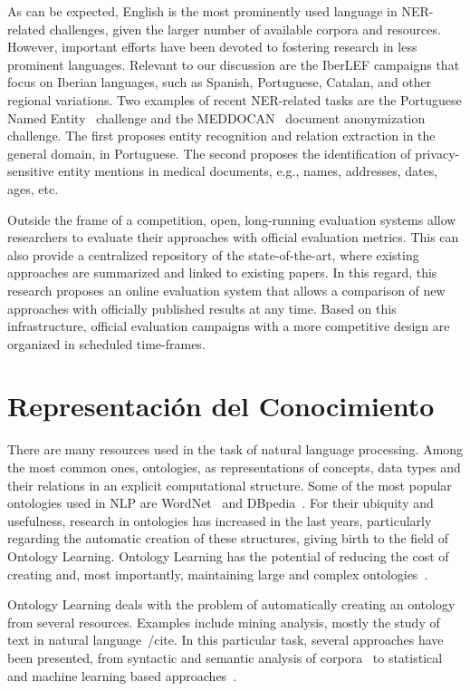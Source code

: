   As can be expected, English is the most prominently used language in NER-related challenges, given the larger
  number of available corpora and resources. However, important efforts have been devoted to fostering research
  in less prominent languages. Relevant to our discussion are the IberLEF campaigns that focus on Iberian languages,
  such as Spanish, Portuguese, Catalan, and other regional variations.
  Two examples of recent NER-related tasks are the Portuguese Named Entity~\cite{glauber2019iberlef} challenge and the MEDDOCAN~\cite{marimon2019automatic} document anonymization challenge.
  The first proposes entity recognition and relation extraction in the general domain, in Portuguese.
  The second proposes the identification of privacy-sensitive entity mentions in medical documents, e.g., names, addresses,
  dates, ages, etc.

  Outside the frame of a competition, open, long-running evaluation systems allow
  researchers to evaluate their approaches with official evaluation metrics.
  This can also provide a centralized repository of the state-of-the-art, where existing approaches are
  summarized and linked to existing papers.
  In this regard, this research proposes an online evaluation system that allows a comparison of
  new approaches with officially published results at any time. Based on this infrastructure, official evaluation campaigns with a more competitive design are organized in scheduled time-frames.

  \section{Representación del Conocimiento}

  There are many resources used in the task of
natural language processing. Among the most common ones, ontologies, as representations
of concepts, data types and their relations in an explicit computational structure.
Some of the most popular ontologies used in NLP are WordNet~\cite{} and DBpedia~\cite{}.
For their ubiquity and usefulness, research in ontologies has increased in the last years,
particularly regarding the automatic creation of these structures,
giving birth to the field of Ontology Learning.
Ontology Learning has the potential of reducing the cost of creating
and, most importantly, maintaining large and complex ontologies~\cite{cimiano2009ontology}.

Ontology Learning deals with the problem of automatically creating an
ontology from several resources. Examples include mining analysis, mostly
the study of text in natural language~/cite{}. In this
particular task, several approaches have been presented, from syntactic and
semantic analysis of corpora~\cite{} to statistical and machine learning based
approaches~\cite{}.

